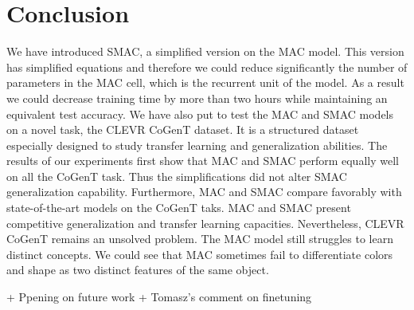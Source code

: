 \section{Conclusion}
We have introduced SMAC, a simplified version on the MAC model. This version has simplified equations and therefore we could reduce significantly the number of parameters in the MAC cell, which is the recurrent unit of the model. As a result we could decrease training time by more than two hours while maintaining an equivalent test accuracy. 
We have also put to test the MAC and SMAC models on a novel task, the CLEVR CoGenT dataset.
It is a structured dataset especially designed to study transfer learning and generalization abilities. The results of our experiments first show that MAC and SMAC perform equally well on all the CoGenT task. Thus the simplifications did not alter SMAC generalization capability.
Furthermore, MAC and SMAC compare favorably with state-of-the-art models on the CoGenT taks. MAC and SMAC present competitive generalization and transfer learning capacities.
Nevertheless, CLEVR CoGenT remains an unsolved problem. The MAC model still struggles to learn distinct concepts. We could see that MAC sometimes fail to differentiate colors and shape as two distinct features of the same object. 

+ Ppening on future work
+ Tomasz’s comment on finetuning

